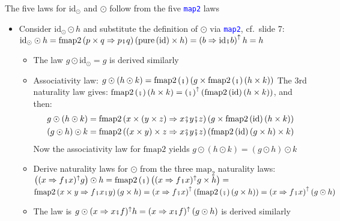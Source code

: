 \vspace{-0.10cm}The five laws for $\text{id}_{\odot}$ and $\odot$
follow from the five \texttt{\textcolor{blue}{\footnotesize{}map2}}
laws
\begin{itemize}
\item Consider $\text{id}_{\odot}\odot h$ and substitute the definition
of $\odot$ via \texttt{\textcolor{blue}{\footnotesize{}map2}}, cf.\ slide
7: $\text{id}_{\odot}\odot h=\text{fmap2}\left(p\times q\Rightarrow p\bef q\right)\left(\text{pure}\left(\text{id}\right)\times h\right)=\left(b\Rightarrow\text{id}\bef b\right)^{\uparrow}h=h$
\begin{itemize}
\item The law $g\odot\text{id}_{\odot}=g$ is derived similarly
\item Associativity law: {\footnotesize{}$g\odot\left(h\odot k\right)=\text{fmap2}\left(\bef\right)\left(g\times\text{fmap2}\left(\bef\right)\left(h\times k\right)\right)$}
The 3rd naturality law gives:{\footnotesize{} $\text{fmap2}\left(\bef\right)\left(h\times k\right)=\left(\bef\right)^{\uparrow}\left(\text{fmap2}\left(\text{id}\right)\left(h\times k\right)\right)$},
and then:{\footnotesize{}
\begin{align*}
g\odot\left(h\odot k\right) & =\text{fmap2}\left(x\times\left(y\times z\right)\Rightarrow x\bef y\bef z\right)\left(g\times\text{fmap2}\left(\text{id}\right)\left(h\times k\right)\right)\\
\left(g\odot h\right)\odot k & =\text{fmap2}\left(\left(x\times y\right)\times z\Rightarrow x\bef y\bef z\right)\left(\text{fmap2}\left(\text{id}\right)\left(g\times h\right)\times k\right)
\end{align*}
}Now the associativity law for{\footnotesize{} $\text{fmap2}$ }yields
{\footnotesize{}$g\odot\left(h\odot k\right)=\left(g\odot h\right)\odot k$}{\footnotesize\par}
\item Derive naturality laws for $\odot$ from the three {\footnotesize{}$\text{map}_{2}$}
naturality laws: {\footnotesize{}$\left((x\Rightarrow f\bef x)^{\uparrow}g\right)\odot h=\text{fmap2}\left(\bef\right)\left((x\Rightarrow f\bef x)^{\uparrow}g\times h\right)=$
$\text{fmap2}\left(x\times y\Rightarrow f\bef x\bef y\right)\left(g\times h\right)=\left(x\Rightarrow f\bef x\right)^{\uparrow}\left(\text{fmap2}\left(\bef\right)\left(g\times h\right)\right)=\left(x\Rightarrow f\bef x\right)^{\uparrow}\left(g\odot h\right)$}{\footnotesize\par}
\item The law is {\footnotesize{}$g\odot(x\Rightarrow x\bef f)^{\uparrow}h=(x\Rightarrow x\bef f)^{\uparrow}\left(g\odot h\right)$}
is derived similarly
\end{itemize}
\end{itemize}


